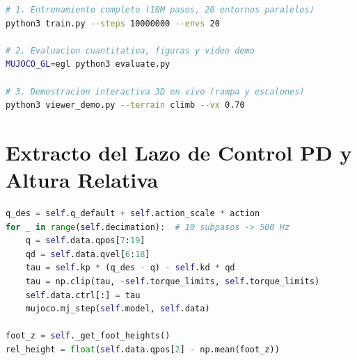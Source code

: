 \documentclass[12pt,a4paper]{article}
\begin{document}
\begin{lstlisting}[language=sh, caption={Comandos para entrenar, evaluar y visualizar en vivo.}]
# 1. Entrenamiento completo (10M pasos, 20 entornos paralelos)
python3 train.py --steps 10000000 --envs 20

# 2. Evaluacion cuantitativa, figuras y video demo
MUJOCO_GL=egl python3 evaluate.py

# 3. Demostracion interactiva 3D en vivo (rampa y escalones)
python3 viewer_demo.py --terrain climb --vx 0.70
\end{lstlisting}

\section{Extracto del Lazo de Control PD y Altura Relativa}
\begin{lstlisting}[language=Python, caption=Lazo PD a 500 Hz y cálculo de altura relativa en quadruped\_env.py.]
q_des = self.q_default + self.action_scale * action
for _ in range(self.decimation):  # 10 subpasos -> 500 Hz
    q = self.data.qpos[7:19]
    qd = self.data.qvel[6:18]
    tau = self.kp * (q_des - q) - self.kd * qd
    tau = np.clip(tau, -self.torque_limits, self.torque_limits)
    self.data.ctrl[:] = tau
    mujoco.mj_step(self.model, self.data)

foot_z = self._get_foot_heights()
rel_height = float(self.data.qpos[2] - np.mean(foot_z))
\end{lstlisting}
\end{document}
